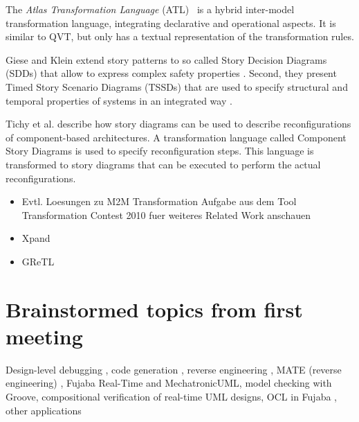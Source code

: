 The \emph{Atlas Transformation Language} (ATL)~\cite{ATL} is a hybrid inter-model transformation language, integrating declarative and operational aspects.
It is similar to QVT, but only has a textual representation of the transformation rules.

Giese and Klein extend story patterns to so called Story Decision Diagrams (SDDs) that allow to express complex safety properties \cite{GK06a} .
Second, they present Timed Story Scenario Diagrams (TSSDs) that are used to specify structural and temporal properties of systems in an integrated way \cite{KG07a}.

Tichy et al. \cite{THH+08} describe how story diagrams can be used to describe reconfigurations of component-based architectures.
A transformation language called Component Story Diagrams is used to specify reconfiguration steps.
This language is transformed to story diagrams that can be executed to perform the actual reconfigurations.


\begin{itemize}
 \item Evtl. Loesungen zu M2M Transformation Aufgabe aus dem Tool Transformation Contest 2010 fuer weiteres Related Work anschauen
 \item Xpand
 \item GReTL \cite{HE11}
\end{itemize}


\section{Brainstormed topics from first meeting}


Design-level debugging \cite{GZ02,Gei02,GZ06},
code generation \cite{GSR05,GBD07},
reverse engineering \cite{NSW+02,BGS+Z08}, MATE (reverse engineering) \cite{SKS+07,ST08},
Fujaba Real-Time and MechatronicUML,
model checking with Groove,
compositional verification of real-time UML designs,
OCL in Fujaba \cite{SZG07},
other applications \cite{KNNZ00,GZ10}
